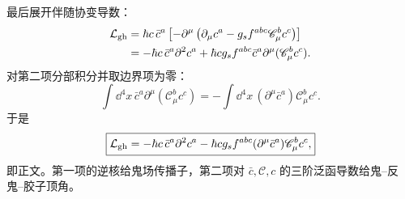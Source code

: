 \begin{derivation}
最后展开伴随协变导数：
\begin{align*}
 \mathcal L_{\rm gh}
 &=\hbar c\,\bar c^a
 \left[-\partial^\mu
 \left(\partial_\mu c^a-g_sf^{abc}\mathscr C_\mu^bc^c\right)\right]\\
 &=-\hbar c\,\bar c^a\partial^2c^a
 +\hbar c g_sf^{abc}\bar c^a\partial^\mu(\mathscr C_\mu^bc^c).
\end{align*}
对第二项分部积分并取边界项为零：
\begin{equation*}
 \int\dd^4x\,\bar c^a\partial^\mu(\mathscr C_\mu^bc^c)
 =-\int\dd^4x\,(\partial^\mu\bar c^a)\mathscr C_\mu^bc^c.
\end{equation*}
于是
\begin{equation*}
 \boxed{
 \mathcal L_{\rm gh}
 =-\hbar c\,\bar c^a\partial^2c^a
 -\hbar c g_sf^{abc}(\partial^\mu\bar c^a)\mathscr C_\mu^bc^c,}
\end{equation*}
即正文。第一项的逆核给鬼场传播子，第二项对 $\bar c,\mathscr C,c$ 的三阶泛函导数给鬼--反鬼--胶子顶角。
\end{derivation}
